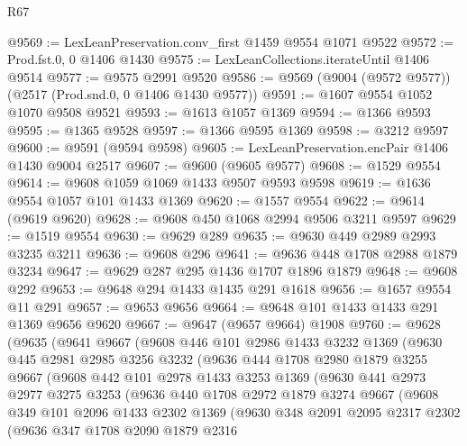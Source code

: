 \begin{lexlean}{R67}
\begin{coremodule}
@9569 := LexLeanPreservation.conv_first @1459 @9554 @1071 @9522
@9572 := Prod.fst.{0, 0} @1406 @1430
@9575 := LexLeanCollections.iterateUntil @1406 @9514
@9577 := @9575 @2991 @9520
@9586 := @9569 (@9004 (@9572 @9577)) (@2517 (Prod.snd.{0, 0} @1406 @1430 @9577))
@9591 := @1607 @9554 @1052 @1070 @9508 @9521
@9593 := @1613 @1057 @1369
@9594 := @1366 @9593
@9595 := @1365 @9528
@9597 := @1366 @9595 @1369
@9598 := @3212 @9597
@9600 := @9591 (@9594 @9598)
@9605 := LexLeanPreservation.encPair @1406 @1430 @9004 @2517
@9607 := @9600 (@9605 @9577)
@9608 := @1529 @9554
@9614 := @9608 @1059 @1069 @1433 @9507 @9593 @9598
@9619 := @1636 @9554 @1057 @101 @1433 @1369
@9620 := @1557 @9554
@9622 := @9614 (@9619 @9620)
@9628 := @9608 @450 @1068 @2994 @9506 @3211 @9597
@9629 := @1519 @9554
@9630 := @9629 @289
@9635 := @9630 @449 @2989 @2993 @3235 @3211
@9636 := @9608 @296
@9641 := @9636 @448 @1708 @2988 @1879 @3234
@9647 := @9629 @287 @295 @1436 @1707 @1896 @1879
@9648 := @9608 @292
@9653 := @9648 @294 @1433 @1435 @291 @1618
@9656 := @1657 @9554 @11 @291
@9657 := @9653 @9656
@9664 := @9648 @101 @1433 @1433 @291 @1369 @9656 @9620
@9667 := @9647 (@9657 @9664) @1908
@9760 := @9628
    (@9635
      (@9641
        @9667
        (@9608
          @446
          @101
          @2986
          @1433
          @3232
          @1369
          (@9630
            @445
            @2981
            @2985
            @3256
            @3232
            (@9636
              @444
              @1708
              @2980
              @1879
              @3255
              @9667
              (@9608
                @442
                @101
                @2978
                @1433
                @3253
                @1369
                (@9630
                  @441
                  @2973
                  @2977
                  @3275
                  @3253
                  (@9636
                    @440
                    @1708
                    @2972
                    @1879
                    @3274
                    @9667
                    (@9608
                      @349
                      @101
                      @2096
                      @1433
                      @2302
                      @1369
                      (@9630
                        @348
                        @2091
                        @2095
                        @2317
                        @2302
                        (@9636
                          @347
                          @1708
                          @2090
                          @1879
                          @2316

\end{coremodule}
\end{lexlean}
